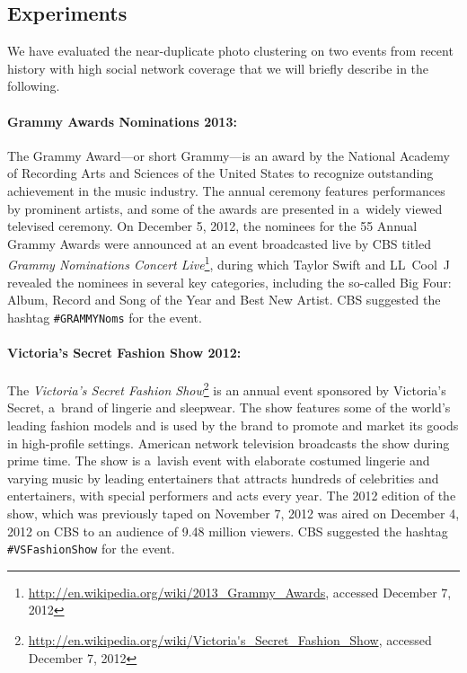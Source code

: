 \subsection{Experiments}

We have evaluated the near-duplicate photo clustering
on two events from recent history with high social network coverage
that we will briefly describe in the following.

\paragraph{Grammy Awards Nominations 2013:}

The Grammy Award---or short Grammy---is an award by
the National Academy of Recording Arts and Sciences of the United States
to recognize outstanding achievement in the music industry.
The annual ceremony features performances by prominent artists,
and some of the awards are presented in a~widely viewed televised ceremony.
On December 5, 2012, the nominees for the 55 Annual Grammy Awards
were announced at an event broadcasted live by CBS
titled \emph{Grammy Nominations Concert
Live}\footnote{\url{http://en.wikipedia.org/wiki/2013_Grammy_Awards},
accessed December 7, 2012},
during which Taylor Swift and LL~Cool~J revealed the nominees
in several key categories, including the so-called Big Four:
Album, Record and Song of the Year and Best New Artist.
CBS suggested the hashtag \texttt{\#GRAMMYNoms} for the event.

\paragraph{Victoria's Secret Fashion Show 2012:}
\label{sec:vsfashionshow}

The \emph{Victoria's Secret Fashion
Show}\footnote{\url{http://en.wikipedia.org/wiki/Victoria's_Secret_Fashion_Show},
accessed December 7, 2012} is an annual event
sponsored by Victoria's Secret, a~brand of lingerie and sleepwear.
The show features some of the world's leading fashion models
and is used by the brand to promote and market its goods in high-profile settings.
American network television broadcasts the show during prime time.
The show is a~lavish event with elaborate costumed lingerie and
varying music by leading entertainers
that attracts hundreds of celebrities and entertainers,
with special performers and acts every year.
The 2012 edition of the show,
which was previously taped on November 7, 2012
was aired on December 4, 2012 on CBS
to an audience of 9.48 million viewers.
CBS suggested the hashtag \texttt{\#VSFashionShow} for the event.

